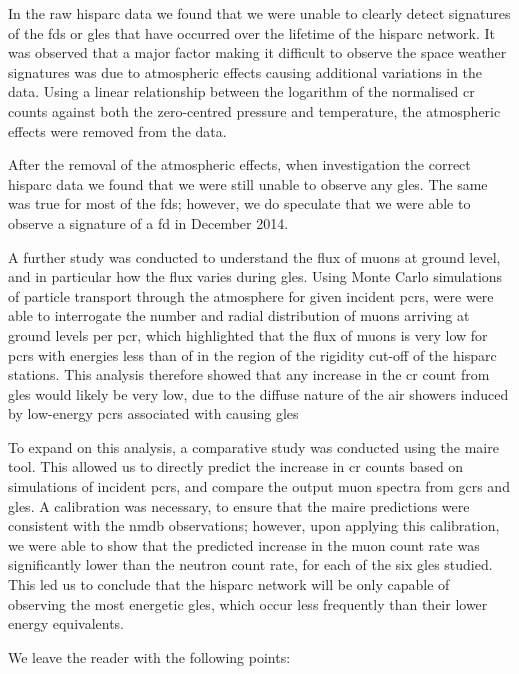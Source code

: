 In the raw \gls{hisparc} data we found that we were unable to clearly detect signatures of the \glspl{fd} or \glspl{gle} that have occurred over the lifetime of the \gls{hisparc} network. It was observed that a major factor making it difficult to observe the space weather signatures was due to atmospheric effects causing additional variations in the data. Using a linear relationship between the logarithm of the normalised \gls{cr} counts against both the zero-centred pressure and temperature, the atmospheric effects were removed from the data.

After the removal of the atmospheric effects, when investigation the correct \gls{hisparc} data we found that we were still unable to observe any \glspl{gle}. The same was true for most of the \glspl{fd}; however, we do speculate that we were able to observe a signature of a \gls{fd} in December 2014. 

A further study was conducted to understand the flux of muons at ground level, and in particular how the flux varies during \glspl{gle}. Using Monte Carlo simulations of particle transport through the atmosphere for given incident \glspl{pcr}, were were able to interrogate the number and radial distribution of muons arriving at ground levels per \gls{pcr}, which highlighted that the flux of muons is very low for \glspl{pcr} with energies less than of in the region of the rigidity cut-off of the \gls{hisparc} stations. This analysis therefore showed that any increase in the \gls{cr} count from \glspl{gle} would likely be very low, due to the diffuse nature of the air showers induced by low-energy \glspl{pcr} associated with causing \glspl{gle}

To expand on this analysis, a comparative study was conducted using the \gls{maire} tool. This allowed us to directly predict the increase in \gls{cr} counts based on simulations of incident \glspl{pcr}, and compare the output muon spectra from \glspl{gcr} and \glspl{gle}. A calibration was necessary, to ensure that the \gls{maire} predictions were consistent with the \gls{nmdb} observations; however, upon applying this calibration, we were able to show that the predicted increase in the muon count rate was significantly lower than the neutron count rate, for each of the six \glspl{gle} studied. This led us to conclude that the \gls{hisparc} network will be only capable of observing the most energetic \glspl{gle}, which occur less frequently than their lower energy equivalents.

We leave the reader with the following points:

